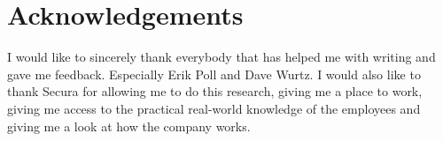 \chapter*{Acknowledgements}
I would like to sincerely thank everybody that has helped me with writing and gave me feedback. Especially Erik Poll and Dave Wurtz. I would also like to thank Secura for allowing me to do this research, giving me a place to work, giving me access to the practical real-world knowledge of the employees and giving me a look at how the company works.
